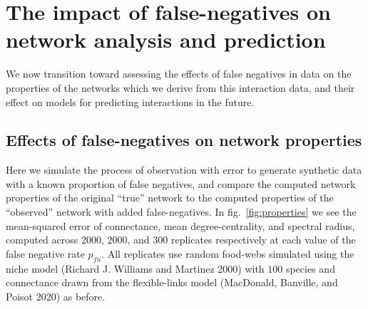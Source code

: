 \documentclass[10pt,oneside]{article}
\begin{document}
\hypertarget{the-impact-of-false-negatives-on-network-analysis-and-prediction}{%
\section{The impact of false-negatives on network analysis and
prediction}\label{the-impact-of-false-negatives-on-network-analysis-and-prediction}}

We now transition toward assessing the effects of false negatives in
data on the properties of the networks which we derive from this
interaction data, and their effect on models for predicting interactions
in the future.

\hypertarget{effects-of-false-negatives-on-network-properties}{%
\subsection{Effects of false-negatives on network
properties}\label{effects-of-false-negatives-on-network-properties}}

Here we simulate the process of observation with error to generate
synthetic data with a known proportion of false negatives, and compare
the computed network properties of the original ``true'' network to the
computed properties of the ``observed'' network with added
false-negatives. In fig.~\ref{fig:properties} we see the mean-squared
error of connectance, mean degree-centrality, and spectral radius,
computed across 2000, 2000, and 300 replicates respectively at each
value of the false negative rate \(p_{fn}\). All replicates use random
food-webs simulated using the niche model (Richard J. Williams and
Martinez 2000) with \(100\) species and connectance drawn from the
flexible-links model (MacDonald, Banville, and Poisot 2020) as before.
\end{document}
